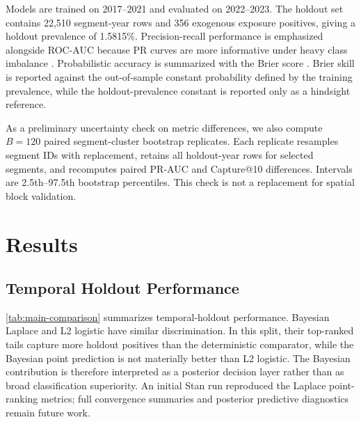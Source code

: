 \documentclass[11pt]{article}
\begin{document}
Models are trained on 2017--2021 and evaluated on 2022--2023. The holdout set
contains 22,510 segment-year rows and 356 exogenous exposure positives, giving
a holdout prevalence of 1.5815\%. Precision-recall performance is emphasized
alongside ROC-AUC because PR curves are more informative under heavy class
imbalance \citep{saitoRehmsmeier2015pr}. Probabilistic accuracy is summarized
with the Brier score \citep{brier1950verification}. Brier skill is reported
against the out-of-sample constant probability defined by the training
prevalence, while the holdout-prevalence constant is reported only as a
hindsight reference.

As a preliminary uncertainty check on metric differences, we also compute
$B=120$ paired segment-cluster bootstrap replicates. Each replicate resamples
segment IDs with replacement, retains all holdout-year rows for selected
segments, and recomputes paired PR-AUC and Capture@10 differences. Intervals
are 2.5th--97.5th bootstrap percentiles. This check is not a replacement for
spatial block validation.

\section{Results}

\subsection{Temporal Holdout Performance}

\autoref{tab:main-comparison} summarizes temporal-holdout performance. Bayesian
Laplace and L2 logistic have similar discrimination. In this split, their
top-ranked tails capture more holdout positives than the deterministic
comparator, while the Bayesian point prediction is not materially better than
L2 logistic. The Bayesian contribution is therefore interpreted as a posterior
decision layer rather than as broad classification superiority. An initial Stan
run reproduced the Laplace point-ranking metrics; full convergence summaries
and posterior predictive diagnostics remain future work.
\end{document}
